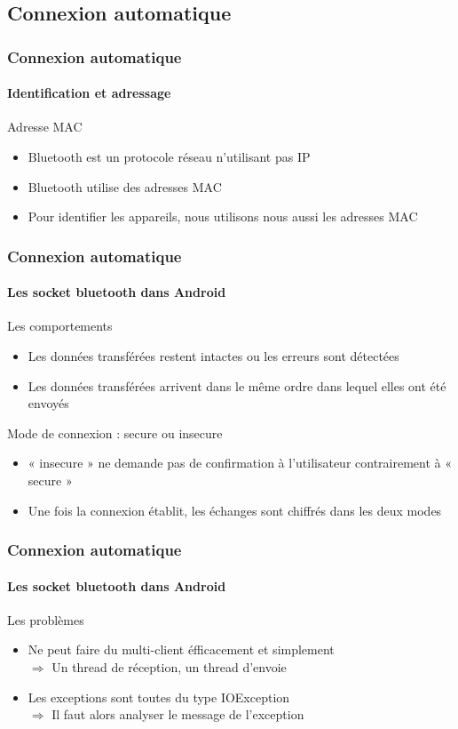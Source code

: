 \documentclass{beamer}
\begin{document}
    \subsection{Connexion automatique}
    \begin{frame}
      \frametitle{Connexion automatique}
      \framesubtitle{Identification et adressage}
      \begin{block}{Adresse MAC}
        \begin{itemize}
          \item Bluetooth est un protocole réseau n'utilisant pas IP
          \item Bluetooth utilise des adresses MAC
          \item Pour identifier les appareils, nous utilisons nous aussi les adresses MAC
        \end{itemize}
      \end{block}
    \end{frame}
    \begin{frame}
      \frametitle{Connexion automatique}
      \framesubtitle{Les socket bluetooth dans Android}
      \begin{block}{Les comportements}
        \begin{itemize}
          \item Les données transférées restent intactes ou les erreurs sont détectées
          \item Les données transférées arrivent dans le même ordre dans lequel elles ont été envoyés
        \end{itemize}
      \end{block}
      \begin{block}{Mode de connexion : secure ou insecure}
        \begin{itemize}
          \item « insecure » ne demande pas de confirmation à l'utilisateur contrairement à « secure »
          \item Une fois la connexion établit, les échanges sont chiffrés dans les deux modes
        \end{itemize}
      \end{block}
    \end{frame}
    \begin{frame}
      \frametitle{Connexion automatique}
      \framesubtitle{Les socket bluetooth dans Android}
      \begin{block}{Les problèmes}
        \begin{itemize}
          \item Ne peut faire du multi-client éfficacement et simplement \\
          $ \Rightarrow $ Un thread de réception, un thread d'envoie
          \item Les exceptions sont toutes du type IOException \\
          $ \Rightarrow $ Il faut alors analyser le message de l'exception
        \end{itemize}
      \end{block}
    \end{frame}
\end{document}
